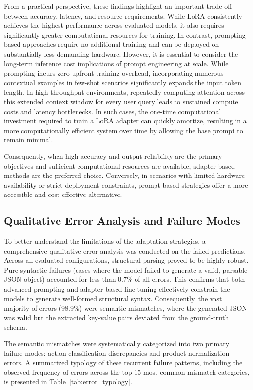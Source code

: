 \documentclass[journal,article,submit,pdftex,moreauthors]{Definitions/mdpi}
\begin{document}
From a practical perspective, these findings highlight an important trade-off between accuracy, latency, and resource requirements. While LoRA consistently achieves the highest performance across evaluated models, it also requires significantly greater computational resources for training. In contrast, prompting-based approaches require no additional training and can be deployed on substantially less demanding hardware. However, it is essential to consider the long-term inference cost implications of prompt engineering at scale. While prompting incurs zero upfront training overhead, incorporating numerous contextual examples in few-shot scenarios significantly expands the input token length. In high-throughput environments, repeatedly computing attention across this extended context window for every user query leads to sustained compute costs and latency bottlenecks. In such cases, the one-time computational investment required to train a LoRA adapter can quickly amortize, resulting in a more computationally efficient system over time by allowing the base prompt to remain minimal.

Consequently, when high accuracy and output reliability are the primary objectives and sufficient computational resources are available, adapter-based methods are the preferred choice. Conversely, in scenarios with limited hardware availability or strict deployment constraints, prompt-based strategies offer a more accessible and cost-effective alternative.

\subsection{Qualitative Error Analysis and Failure Modes}

To better understand the limitations of the adaptation strategies, a comprehensive qualitative error analysis was conducted on the failed predictions. Across all evaluated configurations, structural parsing proved to be highly robust. Pure syntactic failures (cases where the model failed to generate a valid, parsable JSON object) accounted for less than 0.7\% of all errors. This confirms that both advanced prompting and adapter-based fine-tuning effectively constrain the models to generate well-formed structural syntax. Consequently, the vast majority of errors (98.9\%) were semantic mismatches, where the generated JSON was valid but the extracted key-value pairs deviated from the ground-truth schema.

The semantic mismatches were systematically categorized into two primary failure modes: action classification discrepancies and product normalization errors. A summarized typology of these recurrent failure patterns, including the observed frequency of errors across the top 15 most common mismatch categories, is presented in Table~\ref{tab:error_typology}.
\end{document}

